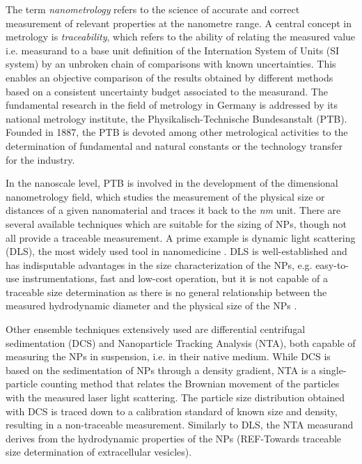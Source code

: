 The term \emph{nanometrology} refers to the science of accurate and correct measurement of relevant properties at the nanometre range. A central concept in metrology is \emph{traceability}, which refers to the ability of relating the measured value i.e. measurand to a base unit definition of the Internation System of Units (SI system) by an unbroken chain of comparisons with known uncertainties. This enables an objective comparison of the results obtained by different methods based on a consistent uncertainty budget associated to the measurand. The fundamental research in the field of metrology in Germany is addressed by its national metrology institute, the Physikalisch-Technische Bundesanstalt (PTB). Founded in 1887, the PTB is devoted among other metrological activities to the determination of fundamental and natural constants or the technology transfer for the industry.

In the nanoscale level, PTB is involved in the development of the dimensional nanometrology field, which studies the measurement of the physical size or distances of a given nanomaterial and traces it back to the \emph{nm} unit. There are several available techniques which are suitable for the sizing of NPs, though not all provide a traceable measurement. A prime example is dynamic light scattering (DLS), the most widely used tool in nanomedicine \citep{murphy_static_1997, hallett_vesicle_1991, egelhaaf_determination_1996, takahashi_precise_2008, jans_dynamic_2009, hoo_comparison_2008}. DLS is well-established and has indisputable advantages in the size characterization of the NPs, e.g. easy-to-use instrumentations, fast and low-cost operation, but it is not capable of a traceable size determination as there is no general relationship between the measured hydrodynamic diameter and the physical size of the NPs \citep{meli_traceable_2012}.

Other ensemble techniques extensively used are differential centrifugal sedimentation (DCS) \citep{fielding_correcting_2012} and Nanoparticle Tracking Analysis (NTA), both capable of measuring the NPs in suspension, i.e. in their native medium. While DCS is based on the sedimentation of NPs through a density gradient, NTA is a single-particle counting method that relates the Brownian movement of the particles with the measured laser light scattering. The particle size distribution obtained with DCS is traced down to a calibration standard of known size and density, resulting in a non-traceable measurement. Similarly to DLS, the NTA measurand derives from the hydrodynamic properties of the NPs (REF-Towards traceable size determination of extracellular vesicles).

